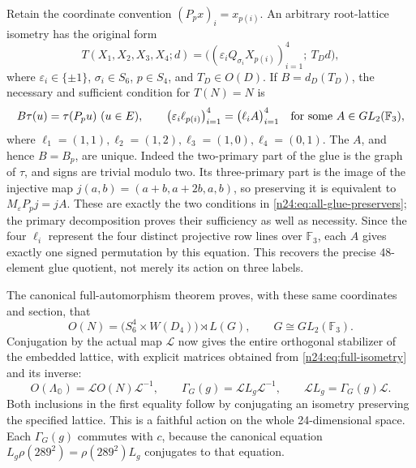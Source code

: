 Retain the coordinate convention \((P_px)_i=x_{p(i)}\).
An arbitrary root-lattice isometry has the original form
\[
 T(X_1,X_2,X_3,X_4;d)
   =\bigl((\varepsilon_iQ_{\sigma_i}X_{p(i)})_{i=1}^4;\ T_Dd\bigr),
\]
where \(\varepsilon_i\in\{\pm1\}\), \(\sigma_i\in S_6\),
\(p\in S_4\), and \(T_D\in O(D)\).  If \(B=d_D(T_D)\),
the necessary and sufficient condition for \(T(N)=N\) is
\begin{equation}
 B\tau(u)=\tau(P_pu)\ (u\in E),\qquad
 \bigl(\varepsilon_i\ell_{p(i)}\bigr)_{i=1}^4
                  =\bigl(\ell_iA\bigr)_{i=1}^4
 \quad\hbox{for some }A\in GL_2(\mathbb F_3),
 \label{n24:eq:all-glue-preservers}
\end{equation}
where
\(\ell_1=(1,1),\ell_2=(1,2),\ell_3=(1,0),\ell_4=(0,1)\).
The \(A\), and hence \(B=B_p\), are unique.  Indeed the
two-primary part of the glue is the graph of \(\tau\), and signs
are trivial modulo two.  Its three-primary part is the image of the
injective map \(j(a,b)=(a+b,a+2b,a,b)\), so preserving it is
equivalent to \(M_\varepsilon P_pj=jA\).  These are exactly
the two conditions in \eqref{n24:eq:all-glue-preservers}; the
primary decomposition proves their sufficiency as well as necessity.
Since the four \(\ell_i\) represent the four distinct projective
row lines over \(\mathbb F_3\), each \(A\) gives exactly one
signed permutation by this equation.  This recovers the precise
48-element glue quotient, not merely its action on three labels.

The canonical full-automorphism theorem proves, with these same
coordinates and section, that
\[
 O(N)=\bigl(S_6^4\times W(D_4)\bigr)\rtimes L(G),
 \qquad G\cong GL_2(\mathbb F_3).
\]
Conjugation by the actual map \(\mathcal L\) now gives the entire
orthogonal stabilizer of the embedded lattice, with explicit matrices
obtained from \eqref{n24:eq:full-isometry} and its inverse:
\begin{equation}
 O(\Lambda_{\mathbb O})
       =\mathcal L O(N)\mathcal L^{-1},\qquad
 \Gamma_G(g)=\mathcal LL_g\mathcal L^{-1},\qquad
 \mathcal LL_g=\Gamma_G(g)\mathcal L.
 \label{n24:eq:full-transported-action}
\end{equation}
Both inclusions in the first equality follow by conjugating an
isometry preserving the specified lattice.  This is a faithful
action on the whole 24-dimensional space. Each \(\Gamma_G(g)\)
commutes with \(c\),
because the canonical equation
\(L_g\rho(289^2)=\rho(289^2)L_g\) conjugates to that equation.

